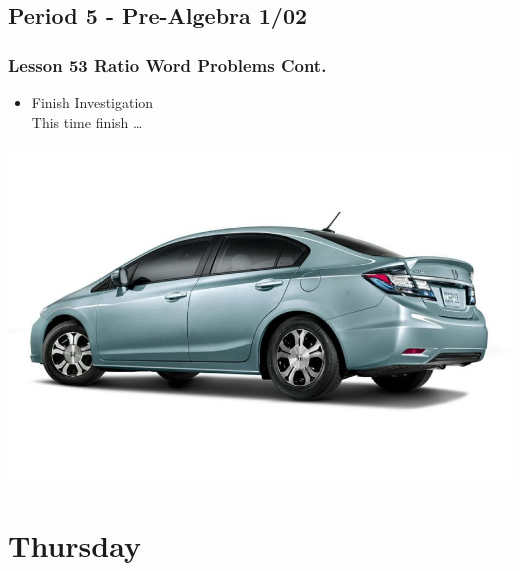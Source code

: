  \subsection[PA1/02]{Period 5 - Pre-Algebra 1/02}
      \begin{frame}[label=PA1_02]
        	\frametitle{Lesson 53 Ratio Word Problems Cont.}   	
       	
       	\begin{itemize}
       		\item Finish  Investigation 
       		\\ This time  finish \dots
       	\end{itemize}   
       	\vspace{-20pt}
       	\begin{center}
       		\includegraphics[width=0.5\linewidth]{Images/honda_civic}
       	\end{center}      
       	\vspace{-20pt}
       \end{frame}
		 
   	 \section[Thu]{Thursday}
